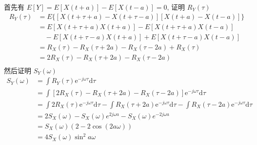 \documentclass[boxes]{homework}
\begin{document}
\begin{solution}
    首先有 $E[Y] = E[X(t+a)] - E[X(t-a)] = 0$, 证明 $R_Y(\tau)$
    \begin{equation}
        \begin{aligned}
            R_Y(\tau) & = E\{[X(t+\tau+a)-X(t+\tau-a)][X(t+a)-X(t-a)]\}           \\
                      & = E[X(t+\tau+a)X(t+a)]-E[X(t+\tau+a)X(t-a)]               \\
                      & \quad - E[X(t+\tau-a)X(t+a)]+E[X(t+\tau-a)X(t-a)]         \\
                      & = R_X(\tau) - R_X(\tau + 2a) - R_X(\tau - 2a) + R_X(\tau) \\
                      & = 2R_X(\tau) - R_X(\tau + 2a) - R_X(\tau - 2a)            \\
        \end{aligned}
    \end{equation}
    然后证明 $S_Y(\omega)$
    \begin{equation}
        \begin{aligned}
            S_Y(\omega) & = \int R_Y(\tau)\mathrm{e}^{-j\omega\tau}\mathrm{d}\tau                                                                                                                            \\
                        & = \int \left[2R_X(\tau) - R_X(\tau + 2a) - R_X(\tau - 2a)\right]\mathrm{e}^{-j\omega\tau}\mathrm{d}\tau                                                                            \\
                        & = \int 2R_X(\tau)\mathrm{e}^{-j\omega\tau}\mathrm{d}\tau - \int R_X(\tau + 2a)\mathrm{e}^{-j\omega\tau}\mathrm{d}\tau - \int R_X(\tau - 2a)\mathrm{e}^{-j\omega\tau}\mathrm{d}\tau \\
                        & = 2S_X(\omega) - S_X(\omega)e^{2j\omega a} - S_X(\omega)e^{-2j\omega a}                                                                                                            \\
                        & = S_X(\omega)(2 - 2\cos(2a\omega))                                                                                                                                                 \\
                        & = 4S_X(\omega)\sin^2 a\omega
        \end{aligned}
    \end{equation}
\end{solution}
\end{document}
